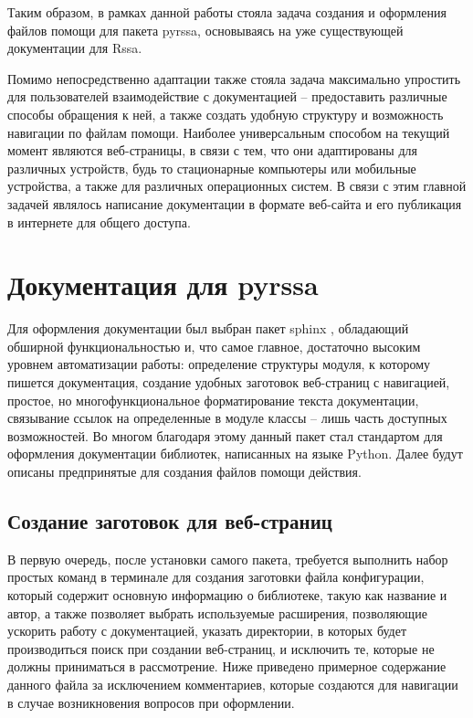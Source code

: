 \documentclass[specialist,
			   substylefile = spbu_report.rtx,
			   subf,href,colorlinks=true, 12pt]{disser}
\begin{document}
Таким образом, в рамках данной работы стояла задача создания и оформления файлов помощи для пакета pyrssa, основываясь на уже существующей документации для Rssa. 

Помимо непосредственно адаптации также стояла задача максимально упростить для пользователей взаимодействие с документацией – предоставить различные способы обращения к ней, а также создать удобную структуру и возможность навигации по файлам помощи. Наиболее универсальным способом на текущий момент являются веб-страницы, в связи с тем, что они адаптированы для различных устройств, будь то стационарные компьютеры или мобильные устройства, а также для различных операционных систем. В связи с этим главной задачей являлось написание документации в формате веб-сайта и его публикация в интернете для общего доступа.


\chapter{Документация для pyrssa}

Для оформления документации был выбран пакет sphinx \cite{sphinx-lib}, обладающий обширной функциональностью и, что самое главное, достаточно высоким уровнем автоматизации работы: определение структуры модуля, к которому пишется документация, создание удобных заготовок веб-страниц с навигацией, простое, но многофункциональное форматирование текста документации, связывание ссылок на определенные в модуле классы – лишь часть доступных возможностей. Во многом благодаря этому данный пакет стал стандартом для оформления документации библиотек, написанных на языке Python. Далее будут описаны предпринятые для создания файлов помощи действия.

\section{Создание заготовок для веб-страниц}

В первую очередь, после установки самого пакета, требуется выполнить набор простых команд в терминале для создания заготовки файла конфигурации, который содержит основную информацию о библиотеке, такую как название и автор, а также позволяет выбрать используемые расширения, позволяющие ускорить работу с документацией, указать директории, в которых будет производиться поиск при создании веб-страниц, и исключить те, которые не должны приниматься в рассмотрение. Ниже приведено примерное содержание данного файла за исключением комментариев, которые создаются для навигации в случае возникновения вопросов при оформлении.
\end{document}
